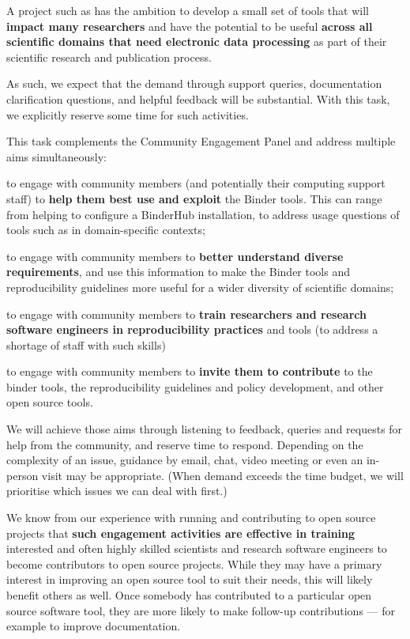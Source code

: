\begin{task}[
  title=Community support and engagement,
  id=community-support,
  lead=SRL,
  PM=13,
  partners={MP,QS,UIO,IFR}
]
A project such as \TheProject{} has the ambition to develop a small set of tools
that will \textbf{impact many researchers} and have the potential to be useful
\textbf{across all scientific domains that need electronic data processing} as part of their
scientific research and publication process.

As such, we expect that the demand through support queries, documentation
clarification questions, and helpful feedback will be substantial. With this
task, we explicitly reserve some time for such activities.

This task complements the Community Engagement Panel and address multiple aims simultaneously:
\begin{compactitem}
\item to engage with community members (and potentially their computing support
  staff) to \textbf{help them best use and exploit} the Binder tools. This can range from
  helping to configure a BinderHub installation, to address usage questions of
  tools such as \repotodocker{} in domain-specific contexts;
\item to engage with community members to \textbf{better understand diverse
  requirements}, and use this information to make the Binder tools and
  reproducibility guidelines more useful for a wider diversity of scientific
  domains;
\item to engage with community members to \textbf{train researchers and research
  software engineers in reproducibility practices} and tools (to address a
  shortage of staff with such skills)
\item to engage with community members to \textbf{invite them to contribute} to the
  binder tools, the reproducibility guidelines and policy development, and other
  open source tools.
\end{compactitem}

We will achieve those aims through listening to feedback, queries and requests
for help from the community, and reserve time to respond. Depending on the
complexity of an issue, guidance by email, chat, video meeting or even an
in-person visit may be appropriate. (When demand exceeds the time budget, we
will prioritise which issues we can deal with first.)

We know from our experience with running and contributing to open source
projects that \textbf{such engagement activities are effective in training} interested
and often highly skilled scientists and research software engineers to become
contributors to open source projects. While they may have a primary interest in
improving an open source tool to suit their needs, this will likely benefit
others as well. Once somebody has contributed to a particular open source
software tool, they are more likely to make follow-up contributions --- for
example to improve documentation.

\end{task}
